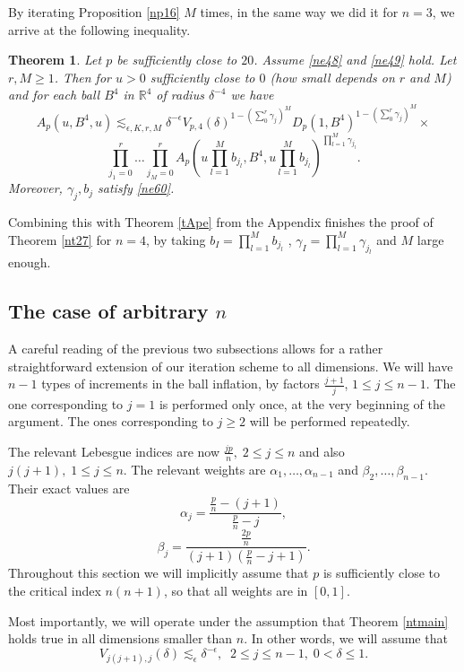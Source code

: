 \documentclass[amssymb,amsfonts,12pt]{amsart}
\newtheorem{theorem}{Theorem}[section]
\def\R{{\mathbb R}}
\begin{document}
By iterating Proposition \ref{np16} $M$ times, in the same way we did it for  $n=3$, we arrive at the following inequality.
\begin{theorem}Let $p$ be sufficiently close to $20$.
\label{nt17}Assume \eqref{ne48} and \eqref{ne49} hold. Let $r, M\ge 1$. Then for $u>0$ sufficiently close to $0$ (how small depends on $r$ and $M$) and for each ball $B^4$ in $\R^4$ of radius $\delta^{-4}$  we have
$$
A_p(u,B^4,u)\lesssim_{\epsilon,K,r,M}\delta^{-\epsilon}V_{p,4}(\delta)^{1-(\sum_{0}^r\gamma_j)^M}D_p(1,B^4)^{1-(\sum_{0}^r\gamma_j)^M}\times
$$
$$\prod_{j_1=0}^r\ldots\prod_{j_M=0}^rA_p(u\prod_{l=1}^Mb_{j_l},B^4,u\prod_{l=1}^Mb_{j_l})^{\prod_{l=1}^M\gamma_{j_l}}.$$
Moreover, $\gamma_j,b_j$ satisfy \eqref{ne60}.
\end{theorem}
Combining this with Theorem \ref{tApe} from the Appendix finishes the proof of Theorem \ref{nt27} for $n=4$, by taking $b_I=\prod_{l=1}^Mb_{j_l}$ , $\gamma_I=\prod_{l=1}^M\gamma_{j_l}$ and $M$ large enough.

\bigskip



\subsection{The case of arbitrary $n$}
\label{slast}
A careful reading of the previous two subsections allows for a rather straightforward extension of our  iteration scheme to all dimensions.
We will have $n-1$ types of increments in the ball inflation, by factors $\frac{j+1}j$, $1\le j\le n-1$. The one corresponding to $j=1$ is performed only once, at the very beginning of the argument. The ones corresponding to $j\ge 2$ will be performed repeatedly.
\bigskip

The relevant Lebesgue indices are now $\frac{jp}{n},\;2\le j\le n$ and also $j(j+1),\;1\le j\le n$. The relevant weights are $\alpha_1,\ldots,\alpha_{n-1}$ and $\beta_2,\ldots,\beta_{n-1}$. Their exact values are
$$\alpha_j=\frac{\frac{p}{n}-(j+1)}{\frac{p}{n}-j},$$
$$\beta_j=\frac{\frac{2p}{n}}{(j+1)(\frac{p}{n}-j+1)}.$$
Throughout this section we will implicitly assume that $p$ is sufficiently close to the critical index $n(n+1)$, so that all weights are in $[0,1]$.

Most importantly, we will operate under the assumption that Theorem \ref{ntmain} holds true  in all dimensions smaller than $n$. In other words, we will assume that
\begin{equation}
\label{ne65}
V_{j(j+1),j}(\delta)\lesssim_\epsilon \delta^{-\epsilon},\;\;2\le j\le n-1,\;0<\delta\le 1.
\end{equation}
\end{document}
